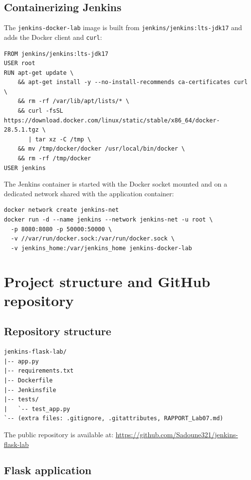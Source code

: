 \documentclass[11pt,a4paper]{article}
\begin{document}
\subsection{Containerizing Jenkins}

The \texttt{jenkins-docker-lab} image is built from
\texttt{jenkins/jenkins:lts-jdk17} and adds the Docker client and \texttt{curl}:

\begin{lstlisting}[caption={Dockerfile of the Jenkins image (outside the application repository).}]
FROM jenkins/jenkins:lts-jdk17
USER root
RUN apt-get update \
    && apt-get install -y --no-install-recommends ca-certificates curl \
    && rm -rf /var/lib/apt/lists/* \
    && curl -fsSL https://download.docker.com/linux/static/stable/x86_64/docker-28.5.1.tgz \
       | tar xz -C /tmp \
    && mv /tmp/docker/docker /usr/local/bin/docker \
    && rm -rf /tmp/docker
USER jenkins
\end{lstlisting}

The Jenkins container is started with the Docker socket mounted and on a dedicated
network shared with the application container:

\begin{lstlisting}
docker network create jenkins-net
docker run -d --name jenkins --network jenkins-net -u root \
  -p 8080:8080 -p 50000:50000 \
  -v //var/run/docker.sock:/var/run/docker.sock \
  -v jenkins_home:/var/jenkins_home jenkins-docker-lab
\end{lstlisting}

\section{Project structure and GitHub repository}

\subsection{Repository structure}

\begin{lstlisting}
jenkins-flask-lab/
|-- app.py
|-- requirements.txt
|-- Dockerfile
|-- Jenkinsfile
|-- tests/
|   `-- test_app.py
`-- (extra files: .gitignore, .gitattributes, RAPPORT_Lab07.md)
\end{lstlisting}

The public repository is available at:
\url{https://github.com/Sadoune321/jenkins-flask-lab}

\subsection{Flask application}
\end{document}
